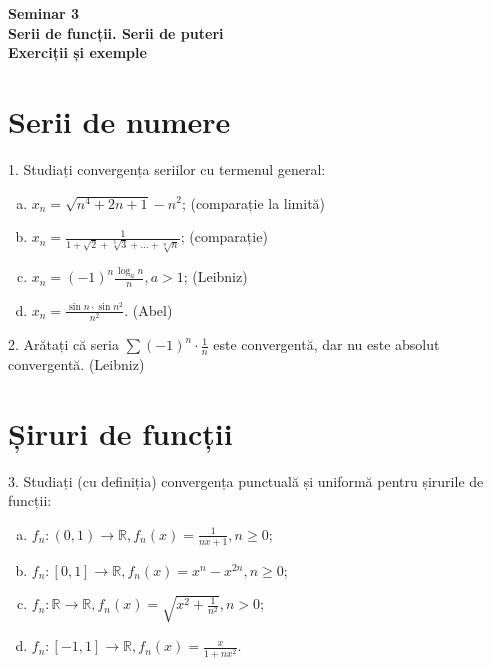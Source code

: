 \documentclass[11pt,a4paper]{article}
\newcommand\RR{\mathbb{R}}
\theoremstyle{dotless}
\theoremstyle{dotlessdr}
\begin{document}

\begin{center}
  {\large\textbf{Seminar 3 \\ Serii de funcții. Serii de puteri \\ Exerciții și exemple}}
\end{center}

\section{Serii de numere}
\label{sec:s-num}

1. Studiați convergența seriilor cu termenul general:
\begin{enumerate}[(a)]
\item $x_n = \sqrt{n^4 + 2n + 1} - n^2$; \hfill (comparație la limită)
\item $x_n = \frac{1}{1 + \sqrt{2} + \sqrt[3]{3} + \dots + \sqrt[n]{n}}$; \hfill (comparație)
\item $x_n = (-1)^n \frac{\log_a n}{n}, a > 1$; \hfill (Leibniz)
\item $x_n = \frac{\sin n \cdot \sin n^2}{n^2}$. \hfill (Abel)
\end{enumerate}

2. Arătați că seria $\sum (-1)^n \cdot \frac{1}{n}$ este convergentă, dar
nu este absolut convergentă. (Leibniz)


\section{Șiruri de funcții}
\label{sec:s-func}

3. Studiați (cu definiția) convergența punctuală și uniformă pentru șirurile de funcții:
\begin{enumerate}[(a)]
\item $f_n : (0, 1) \to \RR, f_n(x) = \frac{1}{nx + 1}, n \geq 0$;
\item $f_n : [0, 1] \to \RR, f_n(x) = x^n - x^{2n}, n \geq 0$;
\item $f_n : \RR \to \RR, f_n(x) = \sqrt{x^2 + \frac{1}{n^2}}, n > 0$;
\item $f_n : [-1, 1] \to \RR, f_n(x) = \frac{x}{1 + nx^2}$.
\end{enumerate}

\end{document}
